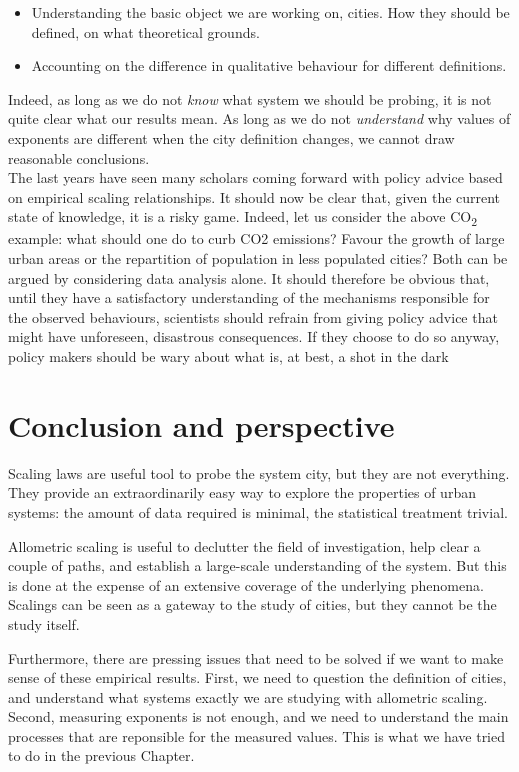 \begin{itemize}
    \item Understanding the basic object we are working on, cities. How they 
        should be defined, on what theoretical grounds.
    \item Accounting on the difference in qualitative behaviour for different
        definitions.
\end{itemize}

Indeed, as long as we do not \emph{know} what system we should be probing, it is
not quite clear what our results mean. As long as we do not \emph{understand}
why values of exponents are different when the city definition changes, we
cannot draw reasonable conclusions.\\

The last years have seen many scholars coming forward with policy advice based
on empirical scaling relationships. It should now be clear that, given the
current state of knowledge, it is a risky game. Indeed, let us consider the
above CO\textsubscript{2} example: what should one do to curb CO2 emissions?
Favour the growth of large urban areas or the repartition of population in less
populated cities?  Both can be argued by considering data analysis alone. It
should therefore be obvious that, until they have a satisfactory understanding
of the mechanisms responsible for the observed behaviours, scientists should
refrain from giving policy advice that might have unforeseen, disastrous
consequences. If they choose to do so anyway, policy makers should be wary about
what is, at best, a shot in the dark


\section{Conclusion and perspective}
\label{sec:conclusion_and_perspective}

Scaling laws are useful tool to probe the system city, but they are not
everything. They provide an extraordinarily easy way to explore the properties
of urban systems: the amount of data required is minimal, the statistical treatment
trivial. 

Allometric scaling is useful to declutter the field of investigation, help clear
a couple of paths, and establish a large-scale understanding of the system. But
this is done at the expense of an extensive coverage of the underlying
phenomena.  Scalings can be seen as a gateway to the study of cities, but they
cannot be the study itself.

Furthermore, there are pressing issues that need to be solved if we want to make
sense of these empirical results. First, we need to question the definition of
cities, and understand what systems exactly we are studying with allometric
scaling. Second, measuring exponents is not enough, and we need to understand
the main processes that are reponsible for the measured values. This is what we
have tried to do in the previous Chapter.
